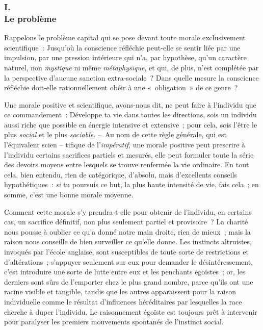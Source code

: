 \documentclass[french,twoside]{book} %
\begin{document}
\subsubsection[{I. Le problème}]{I. \\
Le problème}
\noindent Rappelons le problème capital qui se pose devant toute morale exclusivement scientifique : Jusqu’où la conscience réfléchie peut-elle se sentir liée par une impulsion, par une pression intérieure qui n’a, par hypothèse, qu’un caractère naturel, non \emph{mystique} ni même \emph{métaphysique}, et qui, de plus, n’est complétée par la perspective d’aucune sanction extra-sociale ? Dans quelle mesure la conscience réfléchie doit-elle rationnellement obéir à une « obligation » de ce genre ?\par
Une morale positive et scientifique, avons-nous dit, ne peut faire à l’individu que ce commandement : Développe ta vie dans toutes les directions, sois un individu aussi riche que possible en énergie intensive et extensive ; pour cela, sois l’être le plus \emph{social} et le plus \emph{sociable}. – Au nom de cette règle générale, qui est l’équivalent scien – tifique de l’\emph{impératif}, une morale positive peut prescrire à l’individu certains sacrifices partiels et mesurés, elle peut formuler toute la série des devoirs moyens entre lesquels se trouve renfermée la vie ordinaire. En tout cela, bien entendu, rien de catégorique, d’absolu, mais d’excellents conseils hypothétiques : \emph{si} tu poursuis ce but, la plus haute intensité de vie, fais cela ; en somme, c’est une bonne morale moyenne.\par
Comment cette morale s’y prendra-t-elle pour obtenir de l’individu, en certains cas, un sacrifice définitif, non plus seulement partiel et provisoire ? La charité nous pousse à oublier ce qu’a donné notre main droite, rien de mieux ; mais la raison nous conseille de bien surveiller ce qu’elle donne. Les instincts altruistes, invoqués par l’école anglaise, sont susceptibles de toute sorte de restrictions et d’altérations ; s’appuyer seulement sur eux pour demander le désintéressement, c’est introduire une sorte de lutte entre eux et les penchants égoïstes ; or, les derniers sont sûrs de l’emporter chez le plus grand nombre, parce qu’ils ont une racine visible et tangible, tandis que les autres apparaissent pour la raison individuelle comme le résultat d’influences héréditaires par lesquelles la race cherche à duper l’individu. Le raisonnement égoïste est toujours prêt à intervenir pour paralyser les premiers mouvements spontanés de l’instinct social.\par
\end{document}
